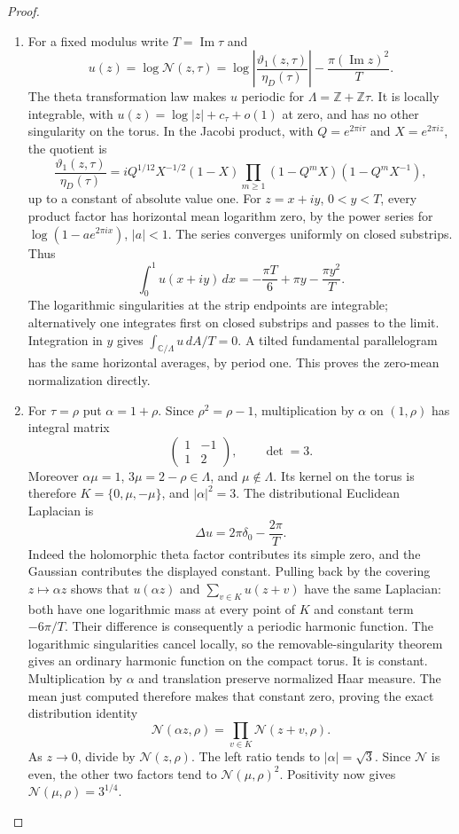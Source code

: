 \begin{proof}
\begin{enumerate}[label=\arabic*.,leftmargin=*]
\item For a fixed modulus write \(T=\operatorname{Im}\tau\) and
\[
 u(z)=\log\mathcal N(z,\tau)
 =\log\left|\frac{\vartheta_1(z,\tau)}{\eta_D(\tau)}\right|
       -\frac{\pi(\operatorname{Im}z)^2}{T}.
\]
The theta transformation law makes \(u\) periodic for
\(\Lambda=\mathbb Z+\mathbb Z\tau\). It is locally integrable,
with \(u(z)=\log|z|+c_\tau+o(1)\) at zero, and has no other
singularity on the torus.  In the Jacobi product, with
\(Q=e^{2\pi i\tau}\) and \(X=e^{2\pi iz}\), the quotient is
\[
 \frac{\vartheta_1(z,\tau)}{\eta_D(\tau)}
 =iQ^{1/12}X^{-1/2}(1-X)
       \prod_{m\ge1}(1-Q^mX)(1-Q^mX^{-1}),
\]
up to a constant of absolute value one. For
\(z=x+iy\), \(0<y<T\), every product factor has horizontal
mean logarithm zero, by the power series for
\(\log(1-ae^{2\pi ix})\), \(|a|<1\). The series converges
uniformly on closed substrips. Thus
\[
 \int_0^1u(x+iy)\,dx
       =-\frac{\pi T}{6}+\pi y-\frac{\pi y^2}{T}.
\]
The logarithmic singularities at the strip endpoints are
integrable; alternatively one integrates first on closed substrips
and passes to the limit. Integration in \(y\) gives
\(\int_{\mathbb C/\Lambda}u\,dA/T=0\). A tilted fundamental
parallelogram has the same horizontal averages, by period one.
This proves the zero-mean normalization directly.

\item For \(\tau=\rho\) put \(\alpha=1+\rho\). Since
\(\rho^2=\rho-1\), multiplication by \(\alpha\) on
\((1,\rho)\) has integral matrix
\[
 \begin{pmatrix}1&-1\\1&2\end{pmatrix},\qquad \det=3.
\]
Moreover \(\alpha\mu=1\), \(3\mu=2-\rho\in\Lambda\),
and \(\mu\notin\Lambda\). Its kernel on the torus is therefore
\(K=\{0,\mu,-\mu\}\), and \(|\alpha|^2=3\).
The distributional Euclidean Laplacian is
\[
 \Delta u=2\pi\delta_0-\frac{2\pi}{T}.
\]
Indeed the holomorphic theta factor contributes its simple zero,
and the Gaussian contributes the displayed constant. Pulling back
by the covering \(z\mapsto\alpha z\) shows that
\(u(\alpha z)\) and \(\sum_{v\in K}u(z+v)\) have the same
Laplacian: both have one logarithmic mass at every point of \(K\)
and constant term \(-6\pi/T\). Their difference is consequently
a periodic harmonic function. The logarithmic singularities cancel
locally, so the removable-singularity theorem gives an ordinary
harmonic function on the compact torus. It is constant.
Multiplication by \(\alpha\) and translation preserve normalized
Haar measure. The mean just computed therefore makes that constant
zero, proving the exact distribution identity
\[
 \mathcal N(\alpha z,\rho)
       =\prod_{v\in K}\mathcal N(z+v,\rho).
\]
As \(z\to0\), divide by \(\mathcal N(z,\rho)\). The left
ratio tends to \(|\alpha|=\sqrt3\). Since \(\mathcal N\) is
even, the other two factors tend to \(\mathcal N(\mu,\rho)^2\).
Positivity now gives \(\mathcal N(\mu,\rho)=3^{1/4}\).


\end{enumerate}
\end{proof}
